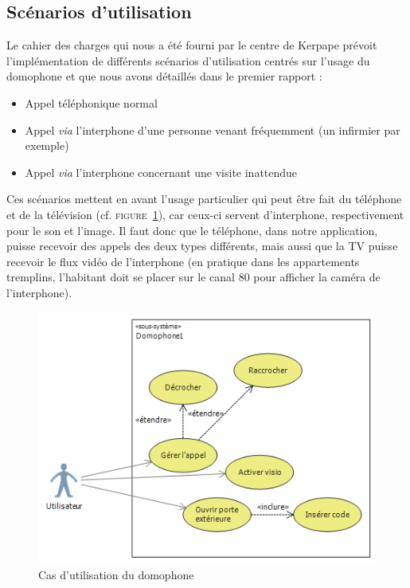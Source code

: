 \subsection{Scénarios d'utilisation}
Le cahier des charges qui nous a été fourni par le centre de Kerpape prévoit l'implémentation de différents scénarios d'utilisation centrés sur l'usage du domophone et que nous avons détaillés dans le premier rapport :
\begin{itemize}\renewcommand{\labelitemi}{$\bullet$}
\item Appel téléphonique normal
\item Appel \textit{via} l'interphone d'une personne venant fréquemment (un infirmier par exemple)
\item Appel \textit{via} l'interphone concernant une visite inattendue 
\end{itemize}
Ces scénarios mettent en avant l'usage particulier qui peut être fait du téléphone et de la télévision (cf. \textsc{figure~\ref{domophone}}), car ceux-ci servent d'interphone, respectivement pour le son et l'image. Il faut donc que le téléphone, dans notre application, puisse recevoir des appels des deux types différents, mais aussi que la TV puisse recevoir le flux vidéo de l'interphone (en pratique dans les appartements tremplins, l'habitant doit se placer sur le canal 80 pour afficher la caméra de l'interphone). 
\begin{figure}[h!]
	\begin{center}
  		\caption{Cas d'utilisation du domophone}
  		\label{domophone}
  		\includegraphics[width=\textwidth]{2-Specifications/img-utilisateur/use_case_diag.PNG}
  	\end{center}
\end{figure}

